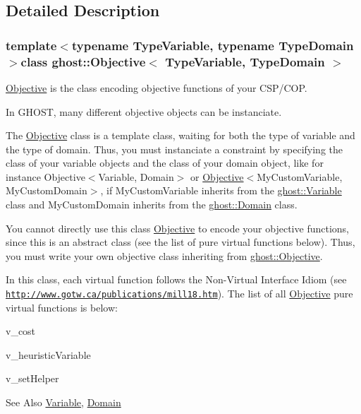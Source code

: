 \subsection{Detailed Description}
\subsubsection*{template$<$typename Type\-Variable, typename Type\-Domain$>$class ghost\-::\-Objective$<$ Type\-Variable, Type\-Domain $>$}

\hyperlink{classghost_1_1Objective}{Objective} is the class encoding objective functions of your C\-S\-P/\-C\-O\-P. 

In G\-H\-O\-S\-T, many different objective objects can be instanciate.

The \hyperlink{classghost_1_1Objective}{Objective} class is a template class, waiting for both the type of variable and the type of domain. Thus, you must instanciate a constraint by specifying the class of your variable objects and the class of your domain object, like for instance Objective$<$\-Variable, Domain$>$ or \hyperlink{classghost_1_1Objective}{Objective}$<$My\-Custom\-Variable, My\-Custom\-Domain$>$, if My\-Custom\-Variable inherits from the \hyperlink{classghost_1_1Variable}{ghost\-::\-Variable} class and My\-Custom\-Domain inherits from the \hyperlink{classghost_1_1Domain}{ghost\-::\-Domain} class.

You cannot directly use this class \hyperlink{classghost_1_1Objective}{Objective} to encode your objective functions, since this is an abstract class (see the list of pure virtual functions below). Thus, you must write your own objective class inheriting from \hyperlink{classghost_1_1Objective}{ghost\-::\-Objective}.

In this class, each virtual function follows the Non-\/\-Virtual Interface Idiom (see \href{http://www.gotw.ca/publications/mill18.htm}{\tt http\-://www.\-gotw.\-ca/publications/mill18.\-htm}). The list of all \hyperlink{classghost_1_1Objective}{Objective} pure virtual functions is below\-:
\begin{DoxyItemize}
\item v\-\_\-cost
\item v\-\_\-heuristic\-Variable
\item v\-\_\-set\-Helper
\end{DoxyItemize}

\begin{DoxySeeAlso}{See Also}
\hyperlink{classghost_1_1Variable}{Variable}, \hyperlink{classghost_1_1Domain}{Domain} 
\end{DoxySeeAlso}


